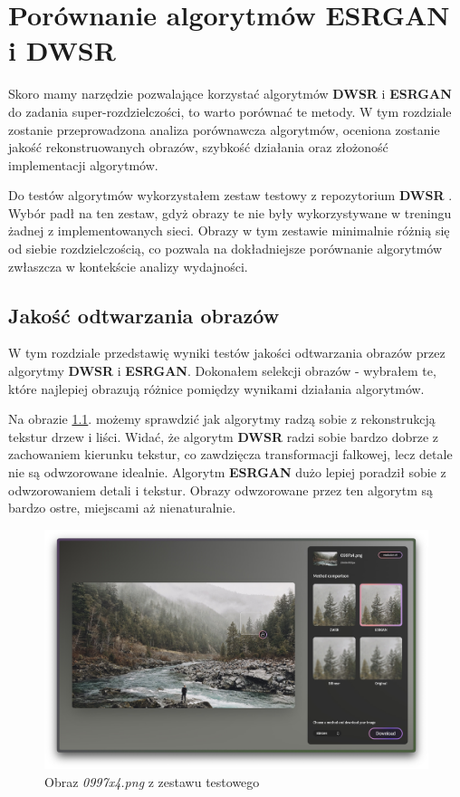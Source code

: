 \chapter{Porównanie algorytmów ESRGAN i DWSR} \label{chap:porownanie_algorytmow}

Skoro mamy narzędzie pozwalające korzystać algorytmów \textbf{DWSR} \cite{guo2017deep} i \textbf{ESRGAN} \cite{wang2018esrgan} do zadania super-rozdzielczości, to warto porównać te metody. W tym rozdziale zostanie przeprowadzona analiza porównawcza algorytmów, oceniona zostanie jakość rekonstruowanych obrazów, szybkość działania oraz złożoność implementacji algorytmów.

Do testów algorytmów wykorzystałem zestaw testowy z repozytorium \textbf{DWSR} \cite{guo2017deep}. Wybór padł na ten zestaw, gdyż obrazy te nie były wykorzystywane w treningu żadnej z implementowanych sieci. Obrazy w tym zestawie minimalnie różnią się od siebie rozdzielczością, co pozwala na dokładniejsze porównanie algorytmów zwłaszcza w kontekście analizy wydajności.

\section{Jakość odtwarzania obrazów}

W tym rozdziale przedstawię wyniki testów jakości odtwarzania obrazów przez algorytmy \textbf{DWSR} i \textbf{ESRGAN}.
Dokonałem selekcji obrazów - wybrałem te, które najlepiej obrazują różnice pomiędzy wynikami działania algorytmów.


Na obrazie \ref{fig:image100}. możemy sprawdzić jak algorytmy radzą sobie z rekonstrukcją tekstur drzew i liści. Widać, że algorytm \textbf{DWSR} radzi sobie bardzo dobrze z zachowaniem kierunku tekstur, co zawdzięcza transformacji falkowej, lecz detale nie są odwzorowane idealnie. Algorytm \textbf{ESRGAN} dużo lepiej poradził sobie z odwzorowaniem detali i tekstur. Obrazy odwzorowane przez ten algorytm są bardzo ostre, miejscami aż nienaturalnie. 

\begin{figure}[H]
    \centering
    \includegraphics[width=0.9\linewidth]{Rozdziały/05.Porownanie_algorytmow/Obrazy/Zrzut ekranu 2023-12-12 o 14.13.48.jpg}  
    \caption{Obraz \textit{0997x4.png} z zestawu testowego \cite{guo2017deep}}
    \label{fig:image100}
\end{figure}

